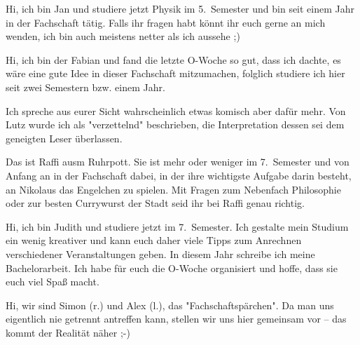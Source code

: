 \begin{multicols*}{2}

{Hi, ich bin Jan und studiere jetzt Physik im 5.\ Semester und bin seit einem Jahr in der Fachschaft tätig. Falls ihr fragen habt könnt ihr euch gerne an mich wenden, ich bin auch meistens netter als ich aussehe ;)}

{Hi, ich bin der Fabian und fand die letzte O-Woche so gut, dass ich dachte, es wäre eine gute Idee in dieser Fachschaft mitzumachen, folglich studiere ich hier seit zwei Semestern bzw. einem Jahr.

Ich spreche aus eurer Sicht wahrscheinlich etwas komisch aber dafür mehr. Von Lutz wurde ich als "verzettelnd" beschrieben, die Interpretation dessen sei dem geneigten Leser überlassen.}

{Das ist Raffi ausm Ruhrpott. Sie ist mehr oder weniger im 7.\ Semester und von Anfang an in der Fachschaft dabei, in der ihre wichtigste Aufgabe darin besteht, an Nikolaus das Engelchen zu spielen. Mit Fragen zum Nebenfach Philosophie oder zur besten Currywurst der Stadt seid ihr bei Raffi genau richtig.}

{Hi, ich bin Judith und studiere jetzt im 7.\ Semester. Ich gestalte mein Studium ein wenig kreativer und kann euch daher viele Tipps zum Anrechnen verschiedener Veranstaltungen geben. In diesem Jahr schreibe ich meine Bachelorarbeit. Ich habe für euch die O-Woche organisiert und hoffe, dass sie euch viel Spaß macht.}

{%
Hi, wir sind Simon (r.) und Alex (l.), das "Fachschaftspärchen". Da man uns eigentlich nie getrennt antreffen kann, stellen wir uns hier gemeinsam vor -- das kommt der Realität näher ;-)

}
\end{multicols*}
